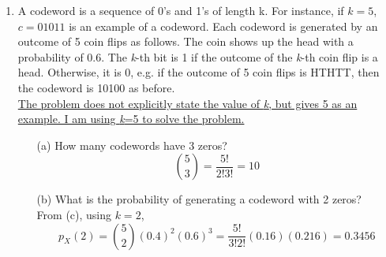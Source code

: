\documentclass{report}
\begin{document}
\begin{enumerate}
\item A codeword is a sequence of 0’s and 1’s of length k. For instance, if $k = 5$, $c = 01011$ is an example
of a codeword. Each codeword is generated by an outcome of 5 coin flips as follows. The coin shows
up the head with a probability of 0.6. The \textit{k}-th bit is 1 if the outcome of the \textit{k}-th coin flip is a head.
Otherwise, it is 0, e.g. if the outcome of 5 coin flips is HTHTT, then the codeword is 10100 as before.\\ \newline
\underline{The problem does not explicitly state the value of \textit{k}, but gives 5 as an}\\ \underline{ example. I am using \textit{k}=5 to solve the problem.}
\begin{itemize}
  \item[(a)] How many codewords have 3 zeros? \\ \newline
  $$\binom{5}{3} = \frac{5!}{2!3!} = 10$$
  \item[(b)] What is the probability of generating a codeword with 2 zeros? \\ \newline
  From (c), using $k=2$,
  $$p_X(2) = \binom{5}{2}(0.4)^2(0.6)^{3} = \frac{5!}{3!2!}(0.16)(0.216) = 0.3456  $$


\end{itemize}
\end{enumerate}
\end{document}
